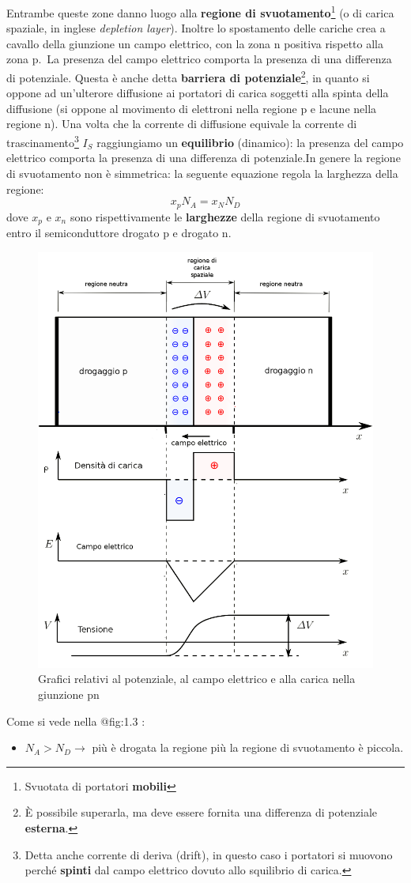 \documentclass[
]{book}
\providecommand{\tightlist}{%
  \setlength{\itemsep}{0pt}\setlength{\parskip}{0pt}}
\begin{document}
Entrambe queste zone danno luogo alla \textbf{regione di
svuotamento}\footnote{Svuotata di portatori \textbf{mobili}} (o di
carica spaziale, in inglese \emph{depletion layer}). Inoltre lo
spostamento delle cariche crea a cavallo della giunzione un campo
elettrico, con la zona n positiva rispetto alla zona p.~La presenza del
campo elettrico comporta la presenza di una differenza di potenziale.
Questa è anche detta \textbf{barriera di potenziale}\footnote{È
  possibile superarla, ma deve essere fornita una differenza di
  potenziale \textbf{esterna}.}, in quanto si oppone ad un'ulterore
diffusione ai portatori di carica soggetti alla spinta della diffusione
(si oppone al movimento di elettroni nella regione p e lacune nella
regione n). Una volta che la corrente di diffusione equivale la corrente
di trascinamento\footnote{Detta anche corrente di deriva (drift), in
  questo caso i portatori si muovono perché \textbf{spinti} dal campo
  elettrico dovuto allo squilibrio di carica.} \(I_S\) raggiungiamo un
\textbf{equilibrio} (dinamico): la presenza del campo elettrico comporta
la presenza di una differenza di potenziale.\newline In genere la
regione di svuotamento non è simmetrica: la seguente equazione regola la
larghezza della regione: \[
x_p N_A = x_N N_D
\] dove \(x_p\) e \(x_n\) sono rispettivamente le \textbf{larghezze}
della regione di svuotamento entro il semiconduttore drogato p e drogato
n.

\begin{figure}[H]
\includegraphics[height=0.5\textwidth, width=!]{immagini/2.png}
\centering
\caption{Grafici relativi al potenziale, al campo elettrico e alla carica nella giunzione pn}
\label{fig:1.3}
\end{figure}

Come si vede nella @fig:1.3 :

\begin{itemize}
\tightlist
\item
  \(N_A > N_D \to\) più è drogata la regione più la regione di
  svuotamento è piccola.
\end{itemize}
\end{document}
